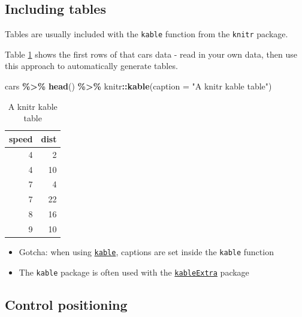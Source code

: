 \documentclass[a4paper, twoside]{templates/ociamthesis}
\providecommand{\tightlist}{%
  \setlength{\itemsep}{0pt}\setlength{\parskip}{0pt}}
\newenvironment{Shaded}{\begin{snugshade}}{\end{snugshade}}
\newcommand{\DataTypeTok}[1]{\textcolor[rgb]{0.13,0.29,0.53}{#1}}
\newcommand{\KeywordTok}[1]{\textcolor[rgb]{0.13,0.29,0.53}{\textbf{#1}}}
\newcommand{\NormalTok}[1]{#1}
\newcommand{\OperatorTok}[1]{\textcolor[rgb]{0.81,0.36,0.00}{\textbf{#1}}}
\newcommand{\StringTok}[1]{\textcolor[rgb]{0.31,0.60,0.02}{#1}}
\renewenvironment{Shaded}
{
  \vspace{10pt}%
  \begin{snugshade}%
}{%
  \end{snugshade}%
  \vspace{8pt}%
}
\theoremstyle{definition}
\theoremstyle{definition}
\theoremstyle{definition}
\theoremstyle{definition}
\theoremstyle{remark}
\begin{document}
\hypertarget{including-tables}{%
\subsection{Including tables}\label{including-tables}}

Tables are usually included with the \texttt{kable} function from the \texttt{knitr} package.

Table \ref{tab:cars-table} shows the first rows of that cars data - read in your own data, then use this approach to automatically generate tables.

\begin{Shaded}
\begin{Highlighting}[]
\NormalTok{cars }\OperatorTok{\%\textgreater{}\%}\StringTok{ }
\StringTok{  }\KeywordTok{head}\NormalTok{() }\OperatorTok{\%\textgreater{}\%}\StringTok{ }
\StringTok{  }\NormalTok{knitr}\OperatorTok{::}\KeywordTok{kable}\NormalTok{(}\DataTypeTok{caption =} \StringTok{"A knitr kable table"}\NormalTok{)}
\end{Highlighting}
\end{Shaded}

\begin{table}

\caption{\label{tab:cars-table}A knitr kable table}
\centering
\begin{tabular}[t]{r|r}
\hline
speed & dist\\
\hline
4 & 2\\
\hline
4 & 10\\
\hline
7 & 4\\
\hline
7 & 22\\
\hline
8 & 16\\
\hline
9 & 10\\
\hline
\end{tabular}
\end{table}

\begin{itemize}
\tightlist
\item
  Gotcha: when using \href{https://www.rdocumentation.org/packages/knitr/versions/1.21/topics/kable}{\texttt{kable}}, captions are set inside the \texttt{kable} function
\item
  The \texttt{kable} package is often used with the \href{https://cran.r-project.org/web/packages/kableExtra/vignettes/awesome_table_in_html.html}{\texttt{kableExtra}} package
\end{itemize}

\hypertarget{control-positioning}{%
\subsection{Control positioning}\label{control-positioning}}
\end{document}
